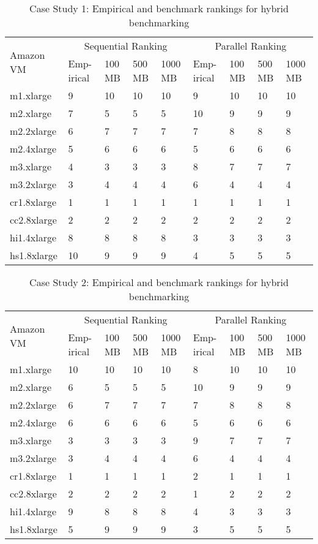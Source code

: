 \begin{table}[h]
\centering
\begin{tabular}{ |p{1.4cm}|p{0.4cm}|p{0.4cm}|p{0.4cm}|p{0.4cm}|p{0.4cm}|p{0.4cm}|p{0.4cm}|p{0.4cm}|  }
\hline
\multirow{2}{*}{Amazon VM} & \multicolumn{4}{|c|}{Sequential Ranking} &
\multicolumn{4}{|c|}{Parallel Ranking}\\ \cline{2-9}
& Emp-irical & 100 MB & 500 MB & 1000 MB & Emp-irical & 100 MB & 500 MB & 1000 MB \\
\hline
\hline
m1.xlarge 	&	9	&	10	&	10	&	10	&	9	&	10	&	10	&	10\\
m2.xlarge 	&	7	&	5	&	5	&	5	&	10	&	9	&	9	&	9\\
m2.2xlarge 	&	6	&	7	&	7	&	7	&	7	&	8	&	8	&	8\\
m2.4xlarge 	&	5	&	6	&	6	&	6	&	5	&	6	&	6	&	6\\
m3.xlarge 	&	4	&	3	&	3	&	3	&	8	&	7	&	7	&	7\\
m3.2xlarge 	&	3	&	4	&	4	&	4	&	6	&	4	&	4	&	4\\
cr1.8xlarge 	&	1	&	1	&	1	&	1	&	1	&	1	&	1	&	1\\
cc2.8xlarge 	&	2	&	2	&	2	&	2	&	2	&	2	&	2	&	2\\
hi1.4xlarge 	&	8	&	8	&	8	&	8	&	3	&	3	&	3	&	3\\
hs1.8xlarge 	&	10	&	9	&	9	&	9	&	4	&	5	&	5	&	5\\
\hline
\end{tabular}
\caption{Case Study 1: Empirical and benchmark rankings for hybrid benchmarking}
\label{table3-1}
\end{table}

\begin{table}[h]
\centering
\begin{tabular}{ |p{1.4cm}|p{0.4cm}|p{0.4cm}|p{0.4cm}|p{0.4cm}|p{0.4cm}|p{0.4cm}|p{0.4cm}|p{0.4cm}|  }
\hline
\multirow{2}{*}{Amazon VM} & \multicolumn{4}{|c|}{Sequential Ranking} &
\multicolumn{4}{|c|}{Parallel Ranking}\\ \cline{2-9}
& Emp-irical & 100 MB & 500 MB & 1000 MB & Emp-irical & 100 MB & 500 MB & 1000 MB \\
\hline
\hline
m1.xlarge 	&	10	&	10	&	10	&	10	&	8	&	10	&	10	&	10\\
m2.xlarge 	&	6	&	5	&	5	&	5	&	10	&	9	&	9	&	9\\
m2.2xlarge 	&	6	&	7	&	7	&	7	&	7	&	8	&	8	&	8\\
m2.4xlarge 	&	6	&	6	&	6	&	6	&	5	&	6	&	6	&	6\\
m3.xlarge 	&	3	&	3	&	3	&	3	&	9	&	7	&	7	&	7\\
m3.2xlarge 	&	3	&	4	&	4	&	4	&	6	&	4	&	4	&	4\\
cr1.8xlarge 	&	1	&	1	&	1	&	1	&	2	&	1	&	1	&	1\\
cc2.8xlarge 	&	2	&	2	&	2	&	2	&	1	&	2	&	2	&	2\\
hi1.4xlarge 	&	9	&	8	&	8	&	8	&	4	&	3	&	3	&	3\\
hs1.8xlarge 	&	5	&	9	&	9	&	9	&	3	&	5	&	5	&	5\\
\hline
\end{tabular}
\caption{Case Study 2: Empirical and benchmark rankings for hybrid benchmarking}
\label{table3-2}
\end{table}


